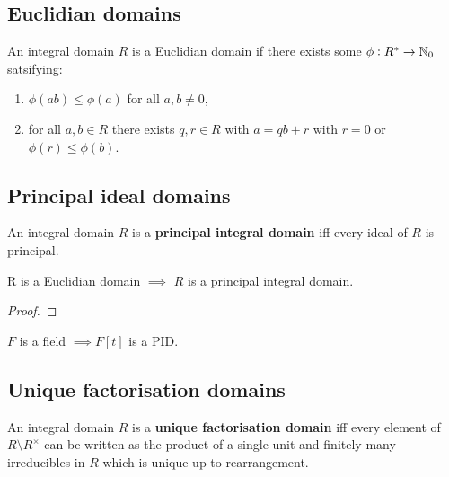 \documentclass[../Year2.tex]{subfiles}
\begin{document}
\subsection{Euclidian domains}

\begin{definition}
    An integral domain $R$ is a Euclidian domain if there exists some  $\phi:R^*\rightarrow\mathbb{N}_0$ satsifying: \begin{enumerate}
        \item $\phi(ab)\leq\phi(a)$ for all $a,b\neq 0$,
        \item for all $a,b\in R$ there exists $q,r\in R$ with $a=qb+r$ with $r=0$ or $\phi(r)\leq\phi(b)$.
    \end{enumerate}
\end{definition}

\subsection{Principal ideal domains}

\begin{definition}
    An integral domain $R$ is a \textbf{principal integral domain} iff every ideal of $R$ is principal.
\end{definition}

\begin{theorem}
    R is a Euclidian domain $\implies$ $R$ is a principal integral domain.
    \begin{proof}
        
    \end{proof}
\end{theorem}

\begin{corollary}
    $F$ is a field $\implies F[t]$ is a PID.
\end{corollary}

\subsection{Unique factorisation domains}

\begin{definition}
    An integral domain $R$ is a \textbf{unique factorisation domain} iff every element of $R\setminus R^\times$ can be written as the product of a single unit and finitely many irreducibles in $R$ which is unique up to rearrangement.
\end{definition}
\end{document}
